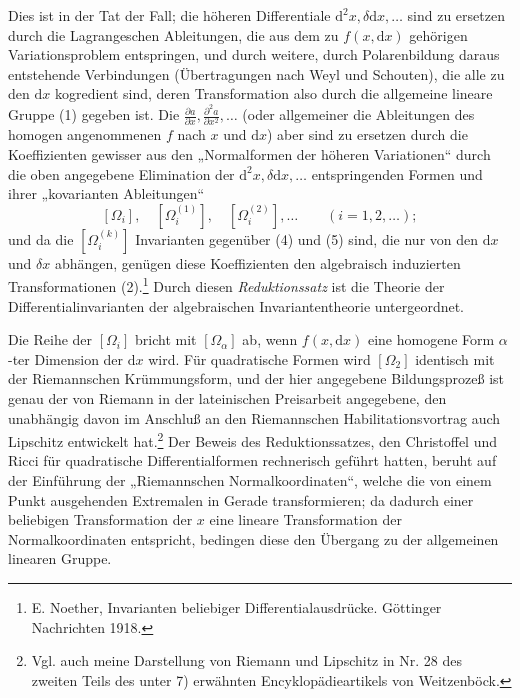 \documentclass[11pt]{article}
\providecommand{\dd}{\mathrm d}
\begin{document}
Dies ist in der Tat der Fall; die höheren Differentiale $\dd^2x,\delta\dd x,\ldots$ sind zu ersetzen durch die Lagrangeschen Ableitungen, die aus dem zu $f(x,\dd x)$ gehörigen Variationsproblem entspringen, und durch weitere, durch Polarenbildung daraus entstehende Verbindungen (Übertragungen nach Weyl und Schouten), die alle zu den $\dd x$ kogredient sind, deren Transformation also durch die allgemeine lineare Gruppe (1) gegeben ist. Die $\frac{\partial a}{\partial x},\frac{\partial^2a}{\partial x^2},\ldots$ (oder allgemeiner die Ableitungen des homogen angenommenen $f$ nach $x$ und $\dd x$) aber sind zu ersetzen durch die Koeffizienten gewisser aus den „Normalformen der höheren Variationen“ durch die oben angegebene Elimination der $\dd^2x,\delta\dd x,\ldots$ entspringenden Formen und ihrer „kovarianten Ableitungen“
\[
 [\Omega_i],\quad [\Omega_i^{(1)}],\quad [\Omega_i^{(2)}],\ldots\qquad (i=1,2,\ldots);
\]
und da die $[\Omega_i^{(k)}]$ Invarianten gegenüber (4) und (5) sind, die nur von den $\dd x$ und $\delta x$ abhängen, genügen diese Koeffizienten den algebraisch induzierten Transformationen (2).\footnote{E. Noether, Invarianten beliebiger Differentialausdrücke. Göttinger Nachrichten 1918.} Durch diesen \emph{Reduktionssatz} ist die Theorie der Differentialinvarianten der algebraischen Invariantentheorie untergeordnet.

Die Reihe der $[\Omega_i]$ bricht mit $[\Omega_\alpha]$ ab, wenn $f(x,\dd x)$ eine homogene Form $\alpha$-ter Dimension der $\dd x$ wird. Für quadratische Formen wird $[\Omega_2]$ identisch mit der Riemannschen Krümmungsform, und der hier angegebene Bildungsprozeß ist genau der von Riemann in der lateinischen Preisarbeit angegebene, den unabhängig davon im Anschluß an den Riemannschen Habilitationsvortrag auch Lipschitz entwickelt hat.\footnote{Vgl. auch meine Darstellung von Riemann und Lipschitz in Nr. 28 des zweiten Teils des unter 7) erwähnten Encyklopädieartikels von Weitzenböck.} Der Beweis des Reduktionssatzes, den Christoffel und Ricci für quadratische Differentialformen rechnerisch geführt hatten, beruht auf der Einführung der „Riemannschen Normalkoordinaten“, welche die von einem Punkt ausgehenden Extremalen in Gerade transformieren; da dadurch einer beliebigen Transformation der $x$ eine lineare Transformation der Normalkoordinaten entspricht, bedingen diese den Übergang zu der allgemeinen linearen Gruppe.
\end{document}
